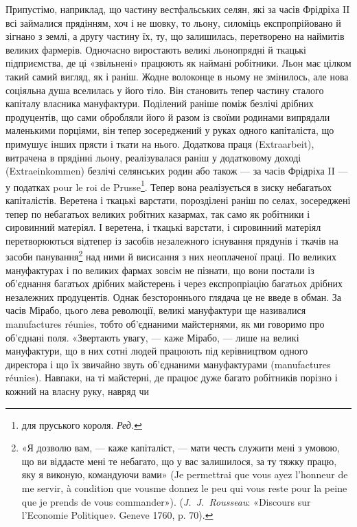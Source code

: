 Припустімо, наприклад, що частину вестфальських селян,
які за часів Фрідріха II всі займалися прядінням, хоч і не шовку,
то льону, силоміць експропрійовано й зігнано з землі, а другу
частину їх, ту, що залишилась, перетворено на наймитів великих
фармерів. Одночасно виростають великі льонопрядні й ткацькі
підприємства, де ці «звільнені» працюють як наймані робітники.
Льон має цілком такий самий вигляд, як і раніш. Жодне волоконце
в ньому не змінилось, але нова соціяльна душа вселилась
у його тіло. Він становить тепер частину сталого капіталу власника
мануфактури. Поділений раніше поміж безлічі дрібних
продуцентів, що сами обробляли його й разом із своїми родинами
випрядали маленькими порціями, він тепер зосереджений у руках
одного капіталіста, що примушує інших прясти і ткати на
нього. Додаткова праця (Extraarbeit), витрачена в прядінні
льону, реалізувалася раніш у додатковому доході (Extraeinkommen)
безлічі селянських родин або також — за часів Фрідріха
II — у податках pour le roi de Prusse\footnote*{
для пруського короля. \emph{Ред.}
}. Тепер вона реалізується
в зиску небагатьох капіталістів. Веретена і ткацькі варстати,
порозділені раніш по селах, зосереджені тепер по небагатьох
великих робітних казармах, так само як робітники і сировинний
матеріял. І веретена, і ткацькі варстати, і сировинний
матеріял перетворюються відтепер із засобів незалежного існування
прядунів і ткачів на засоби панування\footnote{
«Я дозволю вам, — каже капіталіст, — мати честь служити мені
з умовою, що ви віддасте мені те небагато, що у вас залишилося, за ту
тяжку працю, яку я виконую, командуючи вами» (Je permettrai que
vous ayez l’honneur de me servir, à condition que vousme donnez le peu
qui vous reste pour la peine que je prends de vous commander»). (\emph{J.~J.~Rousseau}:
«Discours sur l’Economie Politique». Geneve 1760, p. 70).
} над ними й висисання
з них неоплаченої праці. По великих мануфактурах і по
великих фармах зовсім не пізнати, що вони постали із об’єднання
багатьох дрібних майстерень і через експропріацію багатьох
дрібних незалежних продуцентів. Однак безстороннього глядача
це не введе в обман. За часів Мірабо, цього лева революції, великі
мануфактури ще називалися manufactures réunies, тобто об’єднаними
майстернями, як ми говоримо про об’єднані поля. «Звертають
увагу, — каже Мірабо, — лише на великі мануфактури,
що в них сотні людей працюють під керівництвом одного директора
і що їх звичайно звуть об’єднаними мануфактурами (manufactures
réunies). Навпаки, на ті майстерні, де працює дуже багато
робітників порізно і кожний на власну руку, навряд чи
